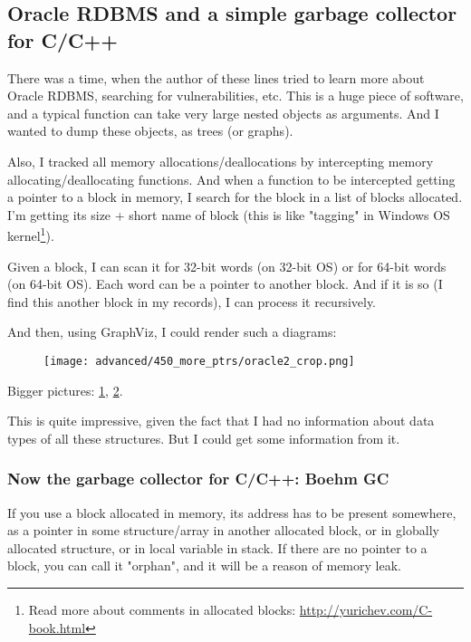 \subsection{Oracle RDBMS and a simple garbage collector for C/C++}

There was a time, when the author of these lines tried to learn more about Oracle RDBMS, searching for vulnerabilities, etc.
This is a huge piece of software, and a typical function can take very large nested objects as arguments.
And I wanted to dump these objects, as trees (or graphs).

Also, I tracked all memory allocations/deallocations by intercepting memory allocating/deallocating functions.
And when a function to be intercepted getting a pointer to a block in memory, I search for the block in a list of blocks allocated.
I'm getting its size + short name of block
(this is like "tagging" in Windows OS kernel\footnote{Read more about comments in allocated blocks: \CNotes{} \url{http://yurichev.com/C-book.html}}).

Given a block, I can scan it for 32-bit words (on 32-bit OS) or for 64-bit words (on 64-bit OS).
Each word can be a pointer to another block.
And if it is so (I find this another block in my records), I can process it recursively.

And then, using GraphViz, I could render such a diagrams:

\begin{figure}[H]
\centering
\texttt{[image: advanced/450\_more\_ptrs/oracle2\_crop.png]}
\end{figure}

Bigger pictures:
\href{\RepoURL/advanced/450_more_ptrs/oracle1.png}{1},
\href{\RepoURL/advanced/450_more_ptrs/oracle2.png}{2}.

This is quite impressive, given the fact that I had no information about data types of all these structures.
But I could get some information from it.

\subsubsection{Now the garbage collector for C/C++: Boehm GC}

If you use a block allocated in memory, its address has to be present somewhere, as a pointer in some structure/array in another allocated block,
or in globally allocated structure, or in local variable in stack.
If there are no pointer to a block, you can call it "orphan", and it will be a reason of memory leak.

